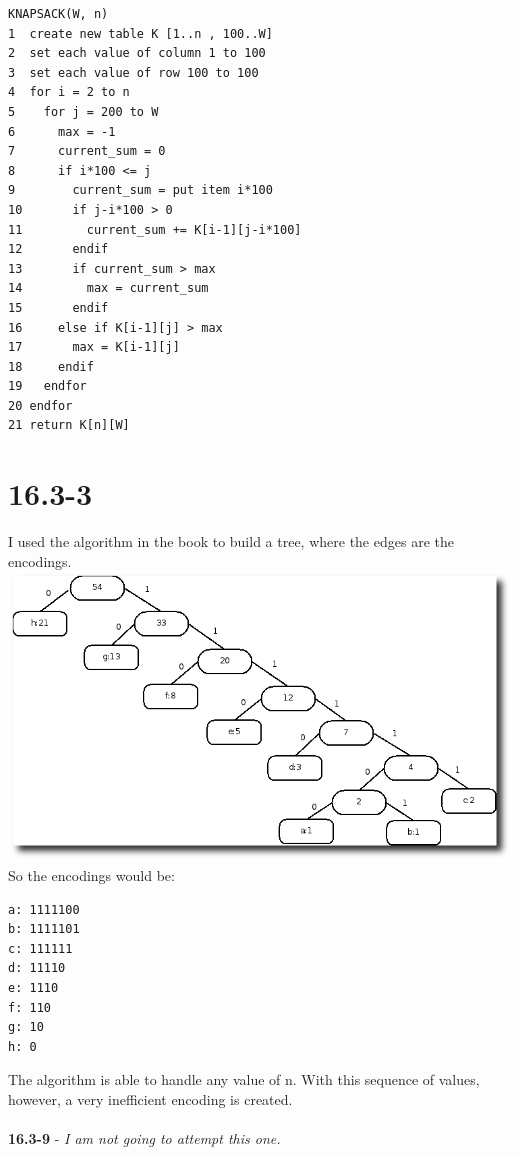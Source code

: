 \documentclass{article}
\begin{document}
\pagebreak

\begin{verbatim}
KNAPSACK(W, n)
1  create new table K [1..n , 100..W]
2  set each value of column 1 to 100
3  set each value of row 100 to 100
4  for i = 2 to n
5    for j = 200 to W
6      max = -1
7      current_sum = 0
8      if i*100 <= j
9        current_sum = put item i*100
10       if j-i*100 > 0
11         current_sum += K[i-1][j-i*100]
12       endif
13       if current_sum > max
14         max = current_sum
15       endif
16     else if K[i-1][j] > max
17       max = K[i-1][j]
18     endif
19   endfor
20 endfor
21 return K[n][W]
\end{verbatim}

\section*{16.3-3}
I used the algorithm in the book to build a tree, where the edges are the encodings.\\
\includegraphics[scale=.5]{3-2.png}
\\So the encodings would be:
\begin{verbatim}
a: 1111100
b: 1111101
c: 111111
d: 11110
e: 1110
f: 110
g: 10
h: 0
\end{verbatim}
The algorithm is able to handle any value of n. With this sequence of values, however,
a very inefficient encoding is created.\\\\
\textbf{16.3-9} - \emph{I am not going to attempt this one.}
\end{document}
